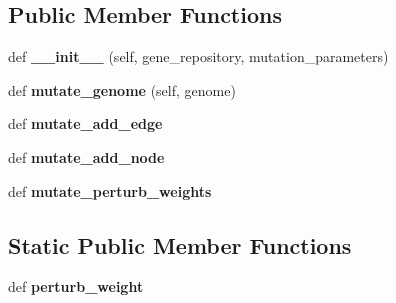 \subsection*{Public Member Functions}
\begin{DoxyCompactItemize}
\item 
def {\bfseries \+\_\+\+\_\+init\+\_\+\+\_\+} (self, gene\+\_\+repository, mutation\+\_\+parameters)\hypertarget{class_n_e_a_t___py_genetics_1_1_n_e_a_t_1_1_generator_1_1_mutator_1_1_mutator_aef75e9ceb50c5d6df86ab49132a1fe84}{}\label{class_n_e_a_t___py_genetics_1_1_n_e_a_t_1_1_generator_1_1_mutator_1_1_mutator_aef75e9ceb50c5d6df86ab49132a1fe84}

\item 
def {\bfseries mutate\+\_\+genome} (self, genome)\hypertarget{class_n_e_a_t___py_genetics_1_1_n_e_a_t_1_1_generator_1_1_mutator_1_1_mutator_aa805f3b8374dcf45ab4406f48bf145d5}{}\label{class_n_e_a_t___py_genetics_1_1_n_e_a_t_1_1_generator_1_1_mutator_1_1_mutator_aa805f3b8374dcf45ab4406f48bf145d5}

\item 
def {\bfseries mutate\+\_\+add\+\_\+edge}\hypertarget{class_n_e_a_t___py_genetics_1_1_n_e_a_t_1_1_generator_1_1_mutator_1_1_mutator_aaee3498341c20339761db1301af7f341}{}\label{class_n_e_a_t___py_genetics_1_1_n_e_a_t_1_1_generator_1_1_mutator_1_1_mutator_aaee3498341c20339761db1301af7f341}

\item 
def {\bfseries mutate\+\_\+add\+\_\+node}\hypertarget{class_n_e_a_t___py_genetics_1_1_n_e_a_t_1_1_generator_1_1_mutator_1_1_mutator_afeabd93fc71a47574e11dd8ac86b1cc2}{}\label{class_n_e_a_t___py_genetics_1_1_n_e_a_t_1_1_generator_1_1_mutator_1_1_mutator_afeabd93fc71a47574e11dd8ac86b1cc2}

\item 
def {\bfseries mutate\+\_\+perturb\+\_\+weights}\hypertarget{class_n_e_a_t___py_genetics_1_1_n_e_a_t_1_1_generator_1_1_mutator_1_1_mutator_aecb97c840811304711e07fe159b0c4bd}{}\label{class_n_e_a_t___py_genetics_1_1_n_e_a_t_1_1_generator_1_1_mutator_1_1_mutator_aecb97c840811304711e07fe159b0c4bd}

\end{DoxyCompactItemize}
\subsection*{Static Public Member Functions}
\begin{DoxyCompactItemize}
\item 
def {\bfseries perturb\+\_\+weight}\hypertarget{class_n_e_a_t___py_genetics_1_1_n_e_a_t_1_1_generator_1_1_mutator_1_1_mutator_ae8e05c9ff54df03a83a0809a7ba1f00a}{}\label{class_n_e_a_t___py_genetics_1_1_n_e_a_t_1_1_generator_1_1_mutator_1_1_mutator_ae8e05c9ff54df03a83a0809a7ba1f00a}

\end{DoxyCompactItemize}
